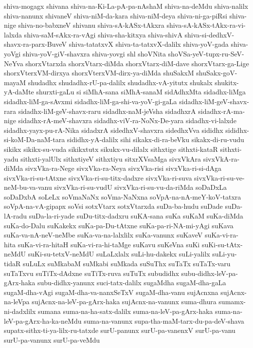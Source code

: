 {shiva-mogagx
shivana
shiva-na-Ki-La-pA-pa-nAshaM
shiva-na-deMdu
shiva-nalilx
shiva-nanunx
shivaneV
shiva-niM-da-kara
shiva-niM-deya
shiva-ni-ga-piRsi
shiva-nige
shiva-no-babxneV
shivanu
shiva-sA-kASx-tAkxra
shiva-sA-kASx-tAkx-ra-vi-lalxda
shiva-saM-sAkx-ra-vAgi
shiva-sha-kitxya
shiva-shivA
shiva-si-dedhxV-shavx-ra-parx-BuveV
shiva-tatatxvX
shiva-ta-tatxvX-dalilx
shiva-yoV-gada
shiva-yoVgi
shiva-yoV-giV-shavxra
shiva-yovgi
shl
shoVNita
shoVSa-yeV-tupx-ru-SeV-NeYva
shorxVtarxda
shorxVtarx-diMda
shorxVtarx-diM-dave
shorxVtarx-ga-Lige
shorxVterxVM-dirxya
shorxVterxVM-dirx-ya-diMda
shuSakxM
shuSakx-goV-mayaM
shudadhx
shudadhx-rU-pa-dalilx
shudadhx-vA-yitutx
shukalx
shukitx-yA-daMte
shurxti-gaLu
si
siMhA-sana
siMhA-sanaM
sidAdhxMta
sidadhx-liMga
sidadhx-liM-ga-sAvxmi
sidadhx-liM-ga-shi-va-yoV-gi-gaLa
sidadhx-liM-geV-shavx-rara
sidadhx-liM-geV-shavx-raru
sidadhx-naM-jeVsha
sidadhxrA
sidadhx-rA-ma-nige
sidadhx-rA-meV-shavxra
sidadhx-viV-ra-NoNx-De-yara
sidadhx-vi-lalxde
sidadhx-yayx-pu-rA-Nika
sidadxrA
sidedhxV-shavxra
sidedhxVva
sididhx
sididhx-si-koM-Da-naM-tara
sididhx-yA-dalilx
sihi
sikakx-di-ra-beVku
sikakx-di-ru-vudu
sikikx
sikikx-su-vuda
sikikxtutx
sikukx-vu-dilalx
sithxtige
sithxti-kataR
sithxti-yadu
sithxti-yalUlx
sithxtiyeV
sithxtiyu
sitxrXVsaMga
sivxVkAra
sivxVkA-ra-diMda
sivxVka-ra-Nege
sivxVka-ra-Neya
sivxVka-risi
sivxVka-ri-si-dAga
sivxVka-ri-su-tAtxne
sivxVka-ri-su-titx-dadxre
sivxVka-ri-suva
sivxVka-ri-su-ve-neM-bu-va-vanu
sivxVka-ri-su-vudU
sivxVka-ri-su-vu-da-riMda
soDaDxLa
soDaDxbA
soLeLx
soVmaNaNx
soVma-NaNxna
soVpA-na-nA-meY-koV-tatxra
soVpA-na-vA-gipapx
soVsi
sotxVtarx
sotxVtarxda
suDa-ba-hudu
suDade
suDa-lA-radu
suDa-la-ri-yade
suDu-titx-dadxru
suKA-sana
suKa
suKaM
suKa-diMda
suKa-do-Dalu
suKakekx
suKa-pa-Du-tAtxne
suKa-pa-ri-NA-mi-yAgi
suKava
suKa-va-nA-neV-neMbe
suKa-va-na-lalxlilx
suKa-vanunx
suKaveV
suKa-vi-ra-hita
suKa-vi-ra-hitaH
suKa-vi-ra-hi-taMge
suKavu
suKeVna
suKi
suKi-su-tAtx-neMdU
suKi-su-tetxV-neMdU
suLaLxlalx
suLi-hu-dakekx
suLi-yalilx
suLi-yu-tidaR
suLuLx
suMkabaM
suMkabi
suMkada
suSuThx
suTaTx
suTaTx-varu
suTaTxvu
suTiTx-dAdxne
suTiTx-ruva
suTuTx
subudidhx
subu-didhx-leV-pa-gArx-haka
subu-didhx-yanunx
suci-tatx-dalilx
sugaMdha
sugaM-dha-gaLa
sugaM-dha-vAgi
sugaM-dha-va-nanxSeTxV
sugaM-dha-vanu
sujAcnxna
sujAcnx-na-leVpa
sujAcnx-na-leV-pa-gArx-haka
sujAcnx-na-vanunx
suma-dhura
sumamx-ni-dadxlilx
sumana
suma-na-ha-satx-dalilx
suma-na-leV-pa-gArx-haka
suma-na-leV-pa-gArx-ha-ka-neMdu
suma-na-vanunx
supa-tha-maM-tarx-du-pa-deV-shava
supatx-sithx-ti-ya-lilx-ru-tatxde
surU-panunx
surU-pa-vanenxV
surU-pa-vanu
surU-pa-vanunx
surU-pa-veMdu
}
